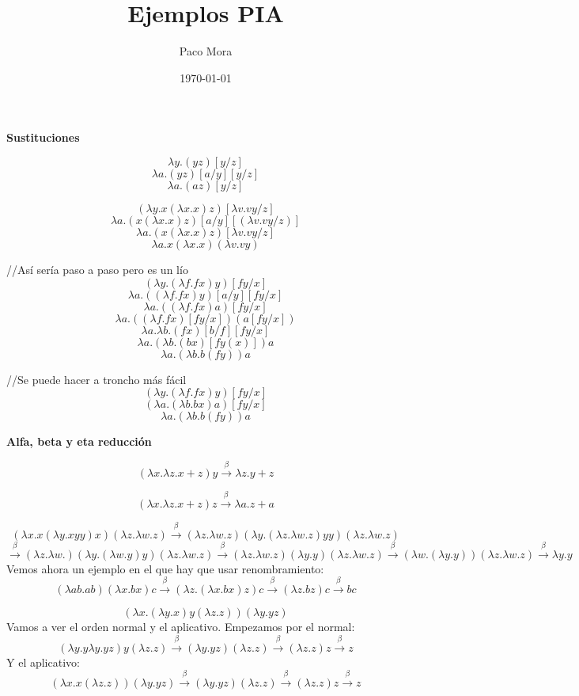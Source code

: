 \documentclass[openany]{book}
\title{Ejemplos PIA}
\author{Paco Mora}
\date{\today}
\begin{document}
\maketitle

\textbf{Sustituciones} 

$$ \lambda y.(yz)[y/z] $$
$$ \lambda a.(yz)[a/y][y/z] $$
$$ \lambda a.(az)[y/z] $$

$$ (\lambda y.x (\lambda x.x)z )[\lambda v.vy / z] $$
$$ \lambda a. (x(\lambda x.x)z) [a / y][(\lambda v.vy / z)] $$
$$ \lambda a. (x(\lambda x.x)z) [\lambda v.vy / z] $$
$$ \lambda a.x(\lambda x.x)(\lambda v.vy) $$


//Así sería paso a paso pero es un lío
$$ (\lambda y.(\lambda f.fx)y)[fy / x] $$
$$ \lambda a.((\lambda f.fx)y)[a /y][fy /x] $$
$$ \lambda a.((\lambda f.fx)a) [fy /x] $$
$$ \lambda a.((\lambda f.fx)[fy  /x])(a [fy /x]) $$
$$ \lambda a.\lambda b.(fx)[b /f][fy /x] $$
$$ \lambda a.(\lambda b.(bx)[fy (x)])a $$
$$ \lambda a.(\lambda b.b(fy))a $$

//Se puede hacer a troncho más fácil
$$ (\lambda y.(\lambda f.fx)y)[fy / x] $$
$$ (\lambda a.(\lambda b.bx)a)[fy / x] $$
$$ \lambda a.(\lambda b.b(fy))a $$

\textbf{Alfa, beta y eta reducción }

$$ (\lambda x.\lambda z.x+z)y \xrightarrow{\beta} \lambda z.y+z $$

$$ (\lambda x.\lambda z.x+z)z \xrightarrow{\beta} \lambda a.z+a $$

$$ (\lambda x.x (\lambda y.xyy)x)(\lambda z.\lambda w.z) \xrightarrow{\beta} (\lambda z.\lambda w. z)(\lambda y.(\lambda z.\lambda w.z)yy)(\lambda z.\lambda w.z) $$
$$ \xrightarrow{\beta} (\lambda z.\lambda w.)(\lambda  y.(\lambda w.y)y) (\lambda z.\lambda w.z) \xrightarrow{\beta} (\lambda  z.\lambda w.z)(\lambda y.y)(\lambda z.\lambda w .z) \xrightarrow{\beta} (\lambda w.(\lambda y.y) )(\lambda z.\lambda w.z) \xrightarrow{\beta} \lambda y.y$$
\vspace{5mm} Vemos ahora un ejemplo en el que hay que usar renombramiento:
$$ (\lambda ab. ab) (\lambda x.bx) c \xrightarrow{\beta} (\lambda z.(\lambda x.bx)z)c \xrightarrow{\beta} (\lambda z.bz)c \xrightarrow{\beta} bc $$

$$ (\lambda x.(\lambda y.x) y(\lambda z.z))(\lambda y.yz) $$
Vamos a ver el orden normal y el aplicativo. Empezamos por el normal:
$$ (\lambda y.y\lambda y.yz)y(\lambda z.z) \xrightarrow{\beta} (\lambda y.yz)(\lambda z.z) \xrightarrow{\beta}(\lambda z.z)z \xrightarrow{\beta} z $$
Y el aplicativo:
$$ (\lambda x.x(\lambda z.z))(\lambda y.yz) \xrightarrow{\beta} (\lambda y.yz)(\lambda z.z) \xrightarrow{\beta}(\lambda z.z)z \xrightarrow{\beta} z $$
\end{document}

